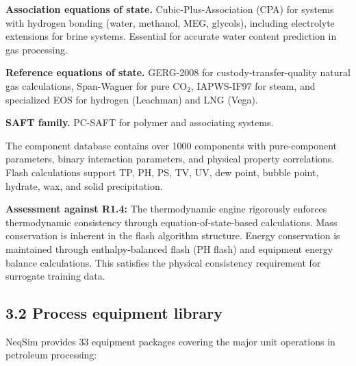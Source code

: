 \documentclass[review,3p]{custom}
\begin{document}
\textbf{Association equations of state.} Cubic-Plus-Association (CPA) \cite{Kontogeorgis1996} for systems with hydrogen bonding (water, methanol, MEG, glycols), including electrolyte extensions for brine systems. Essential for accurate water content prediction in gas processing.

\textbf{Reference equations of state.} GERG-2008 \cite{Kunz2012} for custody-transfer-quality natural gas calculations, Span-Wagner for pure CO$_2$, IAPWS-IF97 for steam, and specialized EOS for hydrogen (Leachman) and LNG (Vega).

\textbf{SAFT family.} PC-SAFT for polymer and associating systems.

The component database contains over 1000 components with pure-component parameters, binary interaction parameters, and physical property correlations. Flash calculations support TP, PH, PS, TV, UV, dew point, bubble point, hydrate, wax, and solid precipitation.

\textbf{Assessment against R1.4:} The thermodynamic engine rigorously enforces thermodynamic consistency through equation-of-state-based calculations. Mass conservation is inherent in the flash algorithm structure. Energy conservation is maintained through enthalpy-balanced flash (PH flash) and equipment energy balance calculations. This satisfies the physical consistency requirement for surrogate training data.

\subsection{3.2 Process equipment library}

NeqSim provides 33 equipment packages covering the major unit operations in petroleum processing:
\end{document}
